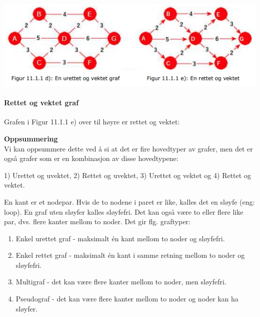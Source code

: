 \documentclass[11pt]{article}
\begin{document}
        \includegraphics[center]{f-11.1.1de.png}

        \paragraph{Rettet og vektet graf} Grafen i Figur 11.1.1 e) over til høyre er rettet og vektet:

\newpage

        \textbf{Oppsummering} \\

            Vi kan oppsummere dette ved å si at det er fire hovedtyper av grafer, men det er også grafer
            som er en kombinasjon av disse hovedtypene:

            1) Urettet og uvektet, 2) Rettet og uvektet, 3) Urettet og vektet og 4) Rettet og vektet.

            En kant er et nodepar. Hvis de to nodene i paret er like, kalles det en sløyfe (eng: loop). En
            graf uten sløyfer kalles sløyfefri. Det kan også være to eller flere like par, dvs. flere kanter
            mellom to noder. Det gir flg. graftyper:

            \begin{enumerate}
                \item Enkel urettet graf - maksimalt én kant mellom to noder og sløyfefri.
                \item Enkel rettet graf - maksimalt én kant i samme retning mellom to noder og sløyfefri.
                \item Multigraf - det kan være flere kanter mellom to noder, men sløyfefri.
                \item Pseudograf - det kan være flere kanter mellom to noder og noder kan ha sløyfer.
            \end{enumerate}
\end{document}
